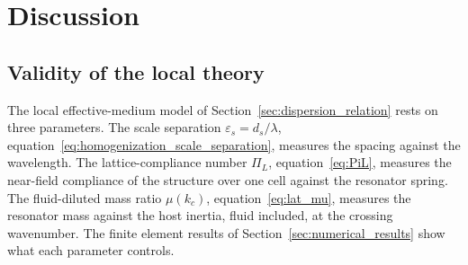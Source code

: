 {\color{red}
\section{Discussion}\label{sec:discussion}

\subsection{Validity of the local theory}\label{subsec:disc_validity}

The local effective-medium model of Section~\ref{sec:dispersion_relation} rests on three parameters. The scale separation $\varepsilon_s=d_s/\lambda$, equation~\eqref{eq:homogenization_scale_separation}, measures the spacing against the wavelength. The lattice-compliance number $\Pi_L$, equation~\eqref{eq:PiL}, measures the near-field compliance of the structure over one cell against the resonator spring. The fluid-diluted mass ratio $\mu(k_c)$, equation~\eqref{eq:lat_mu}, measures the resonator mass against the host inertia, fluid included, at the crossing wavenumber. The finite element results of Section~\ref{sec:numerical_results} show what each parameter controls.

}
